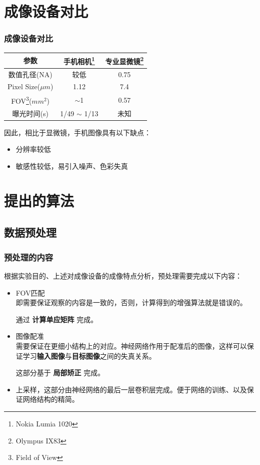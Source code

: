 \documentclass{beamer}
\begin{document}
\section{成像设备对比}
\begin{frame}
\frametitle{成像设备对比}
\begin{table}[!t]
\centering
\begin{tabular}{ccc}
\toprule
参数 & 手机相机\footnote{Nokia Lumia 1020}    &    专业显微镜\footnote{Olympus IX83} \\
\midrule
数值孔径(NA)  &  较低    &  0.75 \\
Pixel Size($\mu m$)   &  1.12  & 7.4 \\
FOV\footnote{Field of View}($mm^2$) & $\sim$1  & 0.57 \\
曝光时间(s)  & 1/49 $\sim$ 1/13   & 未知 \\
\bottomrule
\end{tabular}
\end{table}

因此，相比于显微镜，手机图像具有以下缺点：
\begin{itemize}
\item 分辨率较低
\item 敏感性较低，易引入噪声、色彩失真
\end{itemize}

\end{frame}

\section{提出的算法}

\subsection{数据预处理}

\begin{frame}
\frametitle{预处理的内容}
根据实验目的、上述对成像设备的成像特点分析，预处理需要完成以下内容：
\begin{itemize}
\item FOV匹配 \\
即需要保证观察的内容是一致的，否则，计算得到的增强算法就是错误的。

通过 \textbf{计算单应矩阵} 完成。
\item 图像配准\\
需要保证在更细小结构上的对应。神经网络作用于配准后的图像，这样可以保证学习\textbf{输入图像}与\textbf{目标图像}之间的失真关系。

这部分基于 \textbf{局部矫正} 完成。
\item 上采样，这部分由神经网络的最后一层卷积层完成。便于网络的训练、以及保证网络结构的精简。
\end{itemize}

\end{frame}
\end{document}
